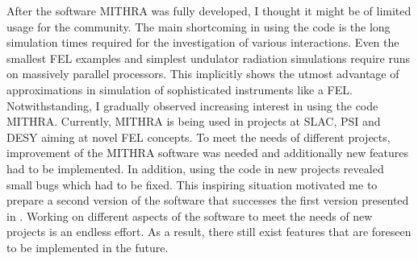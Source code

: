 After the software MITHRA was fully developed, I thought it might be of limited usage for the community.
%
The main shortcoming in using the code is the long simulation times required for the investigation of various interactions.
%
Even the smallest FEL examples and simplest undulator radiation simulations require runs on massively parallel processors.
%
This implicitly shows the utmost advantage of approximations in simulation of sophisticated instruments like a FEL.
%
Notwithstanding, I gradually observed increasing interest in using the code MITHRA.
%
Currently, MITHRA is being used in projects at SLAC, PSI and DESY aiming at novel FEL concepts.
%
To meet the needs of different projects, improvement of the MITHRA software was needed and additionally new features had to be implemented.
%
In addition, using the code in new projects revealed small bugs which had to be fixed.
%
This inspiring situation motivated me to prepare a second version of the software that successes the first version presented in \cite{fallahi2018mithra}.
%
Working on different aspects of the software to meet the needs of new projects is an endless effort.
%
As a result, there still exist features that are foreseen to be implemented in the future.

